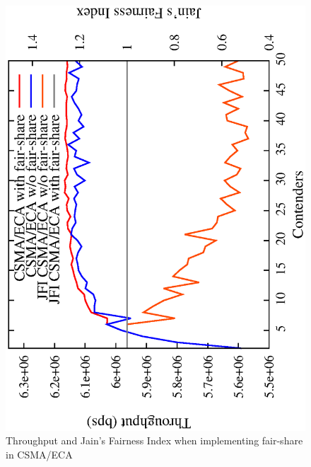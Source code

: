 

\begin{figure}[htbp]
  \centering
  \includegraphics[width=0.7\linewidth, angle = -90]{figures/throughput/CSMA-E2CA_w_fairShare.eps}
  \caption{Throughput and Jain's Fairness Index when implementing fair-share in CSMA/ECA
  \label{fig:fairShare}}
\end{figure}

